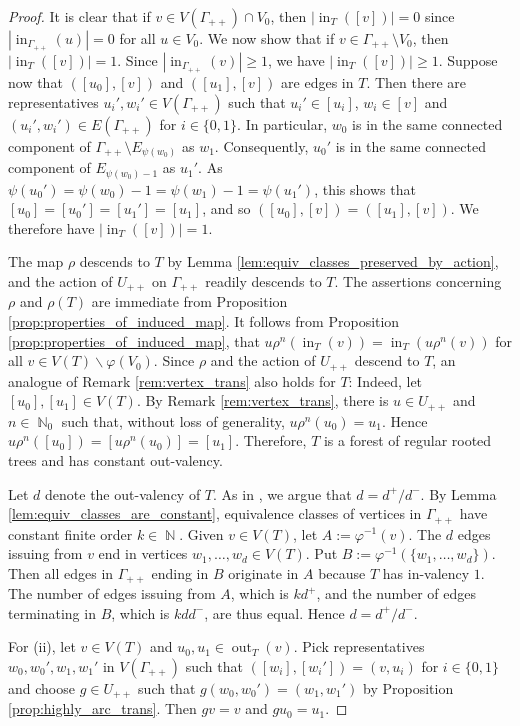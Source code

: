 \documentclass{article}
\DeclareMathOperator\out{out}
\DeclareMathOperator\bbN{\mathbb{N}}
\theoremstyle{definition}
\begin{document}
\begin{proof}
It is clear that if $v\in V(\Gamma_{++})\cap V_{0}$, then $|\operatorname{in}_{T}([v])| = 0$ since $|\operatorname{in}_{\Gamma_{++}}(u)| = 0$ for all $u\in V_{0}$. We now show that if $v\in \Gamma_{++}\!\setminus V_{0}$, then $|\operatorname{in}_{T}([v])| = 1$. Since $|\operatorname{in}_{\Gamma_{++}}(v)|\ge 1$, we have $|\operatorname{in}_{T}([v])|\ge 1$. Suppose now that $([u_0], [v])$ and $([u_1],[v])$ are edges in $T$. Then there are representatives $u_i', w_i'\in V(\Gamma_{++})$ such that $u_i'\in [u_i]$, $w_i\in [v]$ and $(u_i',w_i')\in E(\Gamma_{++})$ for $i\in\{0,1\}$. In particular, $w_0$ is in the same connected component of $\Gamma_{++}\!\setminus E_{\psi(w_0)}$ as $w_1$. Consequently, $u_0'$ is in the same connected component of $E_{\psi(w_0)-1}$ as $u_1'$. As $\psi(u_0') \!=\! \psi(w_0) - 1 \!=\! \psi(w_1)-1 \!=\!\psi(u_1')$, this shows that $[u_0] = [u_0'] = [u_1'] = [u_1]$, and so $([u_0], [v]) = ([u_1], [v])$. We therefore have $|\operatorname{in}_T([v])| = 1$.

The map $\rho$ descends to $T$ by Lemma \ref{lem:equiv_classes_preserved_by_action}, and the action of $U_{++}$ on $\Gamma_{++}$ readily descends to $T$. The assertions concerning $\rho$ and $\rho(T)$ are immediate from Proposition \ref{prop:properties_of_induced_map}. It follows from Proposition \ref{prop:properties_of_induced_map}, that $u\rho^{n}(\operatorname{in}_{T}(v)) = \operatorname{in}_{T}(u\rho^{n}(v))$ for all $v\in V(T)\backslash\varphi(V_{0})$. Since $\rho$ and the action of $U_{++}$ descend to $T$, an analogue of Remark \ref{rem:vertex_trans} also holds for $T$: Indeed, let $[u_{0}],[u_{1}]\in V(T)$. By Remark \ref{rem:vertex_trans}, there is $u\in U_{++}$ and $n\in\bbN_{0}$ such that, without loss of generality, $u\rho^{n}(u_{0})=u_{1}$. Hence $u\rho^{n}([u_{0}])=[u\rho^{n}(u_{0})]=[u_{1}]$. Therefore, $T$ is a forest of regular rooted trees and has constant out-valency.

Let $d$ denote the out-valency of $T$. As in \cite[Lemma 5]{Moe00}, we argue that $d=d^{+}/d^{-}$. By Lemma \ref{lem:equiv_classes_are_constant}, equivalence classes of vertices in $\Gamma_{++}$ have constant finite order $k\in\bbN$. Given $v\in V(T)$, let $A:=\varphi^{-1}(v)$. The $d$ edges issuing from $v$ end in vertices $w_{1},\ldots,w_{d}\in V(T)$. Put $B:=\varphi^{-1}(\{w_{1},\ldots,w_{d}\})$. Then all edges in $\Gamma_{++}$ ending in $B$ originate in $A$ because $T$ has in-valency $1$. The number of edges issuing from $A$, which is $kd^{+}$, and the number of edges terminating in $B$, which is $kdd^{-}$, are thus equal. Hence $d=d^{+}/d^{-}$.

For (ii), let $v\in V(T)$ and $u_0,u_1\in\out_{T}(v)$. Pick representatives $w_0,w_0', w_1,w_1'$ in $V(\Gamma_{++})$ such that $([w_i],[w_i']) = (v,u_i)$ for $i\in\{0,1\}$ and choose $g\in U_{++}$ such that $g(w_0,w_0') = (w_1,w_1')$ by Proposition \ref{prop:highly_arc_trans}. Then $gv = v$ and $gu_0 = u_1$.
\end{proof}
\end{document}
